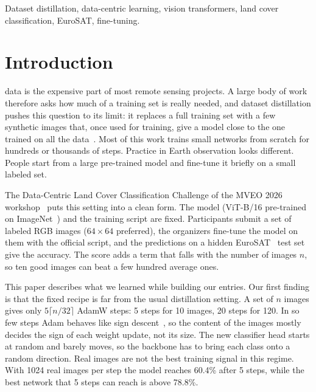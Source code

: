 \documentclass[journal]{IEEEtran}
\begin{document}
\begin{IEEEkeywords}
Dataset distillation, data-centric learning, vision transformers, land cover classification, EuroSAT, fine-tuning.
\end{IEEEkeywords}

\section{Introduction}

 data is the expensive part of most remote sensing projects. A large body of work therefore
asks how much of a training set is really needed, and dataset distillation pushes this question to its limit: it
replaces a full training set with a few synthetic images that, once used for training, give a model close to the one
trained on all the data~\cite{wang2018dd,zhao2021dc,cazenavette2022mtt}. Most of this work trains small networks from
scratch for hundreds or thousands of steps. Practice in Earth observation looks different. People start from a large
pre-trained model and fine-tune it briefly on a small labeled set.

The Data-Centric Land Cover Classification Challenge of the MVEO 2026 workshop~\cite{mveo2026} puts this setting
into a clean form. The model (ViT-B/16 pre-trained on ImageNet~\cite{dosovitskiy2021vit}) and the training script
are fixed. Participants submit a set of labeled RGB images ($64\times64$ preferred), the organizers fine-tune the model on them
with the official script, and the predictions on a hidden EuroSAT~\cite{helber2019eurosat} test set give the
accuracy. The score adds a term that falls with the number of images $n$, so ten good images can beat a few hundred
average ones.

This paper describes what we learned while building our entries. Our first finding is that the fixed recipe is far
from the usual distillation setting. A set of $n$ images gives only $5\lceil n/32\rceil$ AdamW steps: 5 steps for
10 images, 20 steps for 120. In so few steps Adam behaves like sign descent~\cite{balles2018dissecting,kunstner2023sign},
so the content of the images mostly decides the sign of each weight update, not its size. The new classifier head
starts at random and barely moves, so the backbone has to bring each class onto a random direction. Real images
are not the best training signal in this regime. With 1024 real images per step the model reaches 60.4\% after 5
steps, while the best network that 5 steps can reach is above 78.8\%.
\end{document}
